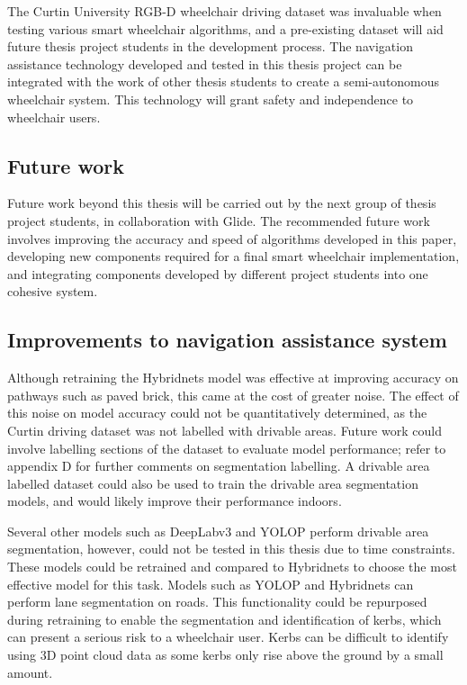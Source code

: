 The Curtin University RGB-D wheelchair driving dataset was invaluable
when testing various smart wheelchair algorithms, and a pre-existing dataset will
aid future thesis project students in the development process.
The navigation assistance technology developed and tested in this thesis project
can be integrated with the work of other thesis students to create a semi-autonomous
wheelchair system. This technology will grant safety and independence
to wheelchair users.

\pagebreak
\subsection{Future work}
\label{sec:future_work}
Future work beyond this thesis will be carried out by the next
group of thesis project students, in collaboration with Glide.
The recommended future work involves improving the accuracy
and speed of algorithms developed in this paper, developing
new components required for a final smart wheelchair implementation,
and integrating components developed by different project students into 
one cohesive system.

\subsection{Improvements to navigation assistance system}

Although retraining the Hybridnets model was effective at improving
accuracy on pathways such as paved brick, this came at the cost
of greater noise. The effect of this noise on model accuracy
could not be quantitatively determined, as the Curtin driving dataset
was not labelled with drivable areas. Future work could involve labelling sections of the
dataset to evaluate model performance; refer to appendix D for further comments on segmentation labelling.
A drivable area labelled dataset could
also be used to train the drivable area segmentation models,
and would likely improve their performance indoors.

Several other models such as DeepLabv3 and YOLOP perform drivable area
segmentation, however, could not be tested in this thesis due to time constraints.
These models could be retrained and compared to Hybridnets
to choose the most effective model for this task.
Models such as YOLOP and Hybridnets can perform
lane segmentation on roads. This functionality could be repurposed
during retraining to enable the segmentation and identification of kerbs,
which can present a serious risk to a wheelchair user. Kerbs can be difficult
to identify using 3D point cloud data as some kerbs only rise above
the ground by a small amount.


